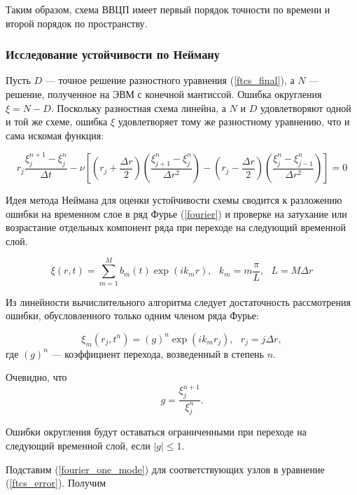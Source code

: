 Таким образом, схема ВВЦП имеет первый порядок точности по времени и второй порядок по пространству.

\subsubsection{Исследование устойчивости по Нейману}

Пусть $D$ — точное решение разностного уравнения (\ref{ftcs_final}), а $N$ — решение, полученное на ЭВМ с конечной мантиссой. Ошибка округления
$\xi = N - D$. Поскольку разностная схема линейна, а $N$ и $D$
удовлетворяют одной и той же схеме, ошибка $\xi$ удовлетворяет тому же
разностному уравнению, что и сама искомая функция:

\begin{equation} \label{ftcs_error}
	r_j \dfrac{\xi_j^{n+1} - \xi_j^n}{\Delta t}	 -
	\nu \left[ \left(r_j + \dfrac{\Delta r}{2}\right) \left( \dfrac{\xi_{j+1}^n - \xi_j^n}{\Delta r^2} \right) -
	\left(r_j - \dfrac{\Delta r}{2}\right) \left( \dfrac{\xi_{j}^n - \xi_{j-1}^n}{\Delta r^2} \right) \right] = 0
\end{equation}


Идея метода Неймана для оценки устойчивости схемы сводится к разложению ошибки на временном слое в ряд Фурье (\ref{fourier}) и проверке на затухание или возрастание отдельных компонент ряда при переходе на следующий временной слой. 

\begin{equation} \label{fourier}
	\xi (r, t) = \sum_{m=1}^M b_m(t) \exp(ik_m r),  \ \ \ k_m = m \dfrac{\pi}{L}, \ \ \ L = M \Delta r
\end{equation}

Из линейности вычислительного алгоритма следует достаточность рассмотрения ошибки, обусловленного только одним членом ряда Фурье:

\begin{equation} \label{fourier_one_mode}
	\xi_m (r_j, t^n) = (g)^n \exp (ik_mr_j), \ \ \ r_j = j \Delta r,
\end{equation}
где $(g)^n$ — коэффициент перехода, возведенный в степень $n$.

Очевидно, что 
\begin{equation} \label{g}
	g = \dfrac{\xi_j^{n+1}}{\xi_j^n}.
\end{equation}

Ошибки округления будут оставаться ограниченными при переходе на следующий временной слой, если $|g| \le 1$.

Подставим (\ref{fourier_one_mode}) для соответствующих узлов в уравнение (\ref{ftcs_error}). Получим

